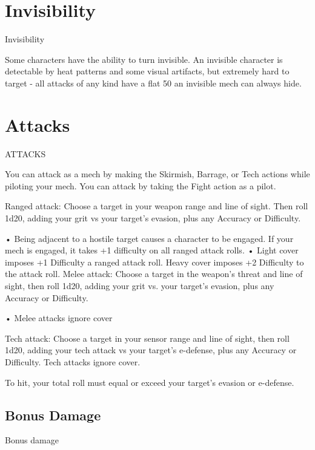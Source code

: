                                                                                                                    
\section{Invisibility}

                                                 Invisibility  

Some characters have the ability to turn invisible. An invisible character is detectable by heat  
patterns and some visual artifacts, but extremely hard to target - all attacks of any kind have a  
flat 50%
an invisible mech can always hide.  
\section{Attacks}
                                                  ATTACKS  

You can attack as a mech by making the Skirmish, Barrage, or Tech actions while piloting your  
mech. You can attack by taking the Fight action as a pilot.
 
Ranged attack: Choose a target in your weapon range and line of sight. Then roll 1d20, adding  
your grit vs your target’s evasion, plus any Accuracy or Difficulty.
 
                      •  Being adjacent to a hostile target causes a character to be engaged. If your  
                        mech is engaged, it takes +1 difficulty on all ranged attack rolls.  
                      •  Light cover imposes +1 Difficulty a ranged attack roll. Heavy cover imposes  
                        +2 Difficulty to the attack roll.  
Melee attack: Choose a target in the weapon’s threat and line of sight, then roll 1d20, adding  
your grit vs. your target’s evasion, plus any Accuracy or Difficulty.
 
                      •  Melee attacks ignore cover
 
Tech attack: Choose a target in your sensor range and line of sight, then roll 1d20, adding your  
tech attack vs your target’s e-defense, plus any Accuracy or Difficulty. Tech attacks ignore  
cover.
 

To hit, your total roll must equal or exceed your target’s evasion or e-defense.
 
\subsection{Bonus Damage}
                                             Bonus damage  

